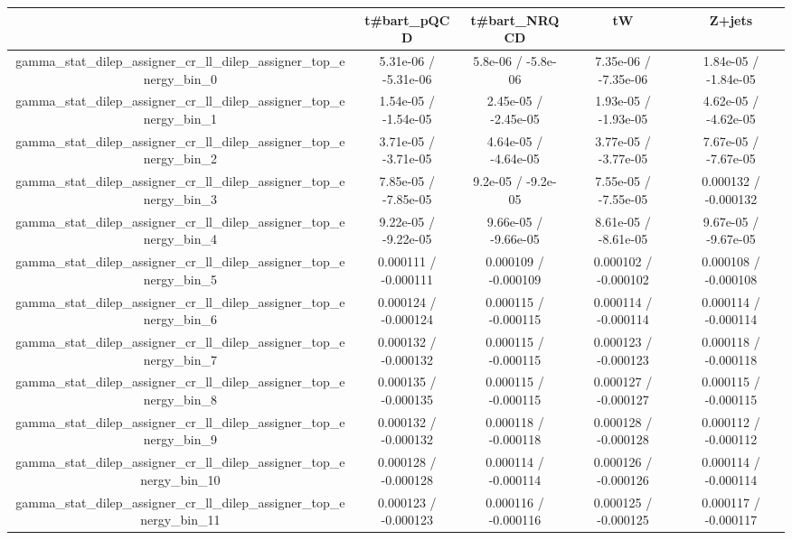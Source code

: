 \documentclass[10pt]{article}
\begin{document}
\begin{table}[htbp]
\begin{center}
\begin{tabular}{|c|c|c|c|c|}
\hline 
      & t#bar{t}_{pQCD}      & t#bar{t}_{NRQCD}      & tW      & Z+jets \\ 
\hline 
  gamma_stat_dilep_assigner_cr_ll_dilep_assigner_top_energy_bin_0 & 5.31e-06 / -5.31e-06 & 5.8e-06 / -5.8e-06 & 7.35e-06 / -7.35e-06 & 1.84e-05 / -1.84e-05 \\ 
  gamma_stat_dilep_assigner_cr_ll_dilep_assigner_top_energy_bin_1 & 1.54e-05 / -1.54e-05 & 2.45e-05 / -2.45e-05 & 1.93e-05 / -1.93e-05 & 4.62e-05 / -4.62e-05 \\ 
  gamma_stat_dilep_assigner_cr_ll_dilep_assigner_top_energy_bin_2 & 3.71e-05 / -3.71e-05 & 4.64e-05 / -4.64e-05 & 3.77e-05 / -3.77e-05 & 7.67e-05 / -7.67e-05 \\ 
  gamma_stat_dilep_assigner_cr_ll_dilep_assigner_top_energy_bin_3 & 7.85e-05 / -7.85e-05 & 9.2e-05 / -9.2e-05 & 7.55e-05 / -7.55e-05 & 0.000132 / -0.000132 \\ 
  gamma_stat_dilep_assigner_cr_ll_dilep_assigner_top_energy_bin_4 & 9.22e-05 / -9.22e-05 & 9.66e-05 / -9.66e-05 & 8.61e-05 / -8.61e-05 & 9.67e-05 / -9.67e-05 \\ 
  gamma_stat_dilep_assigner_cr_ll_dilep_assigner_top_energy_bin_5 & 0.000111 / -0.000111 & 0.000109 / -0.000109 & 0.000102 / -0.000102 & 0.000108 / -0.000108 \\ 
  gamma_stat_dilep_assigner_cr_ll_dilep_assigner_top_energy_bin_6 & 0.000124 / -0.000124 & 0.000115 / -0.000115 & 0.000114 / -0.000114 & 0.000114 / -0.000114 \\ 
  gamma_stat_dilep_assigner_cr_ll_dilep_assigner_top_energy_bin_7 & 0.000132 / -0.000132 & 0.000115 / -0.000115 & 0.000123 / -0.000123 & 0.000118 / -0.000118 \\ 
  gamma_stat_dilep_assigner_cr_ll_dilep_assigner_top_energy_bin_8 & 0.000135 / -0.000135 & 0.000115 / -0.000115 & 0.000127 / -0.000127 & 0.000115 / -0.000115 \\ 
  gamma_stat_dilep_assigner_cr_ll_dilep_assigner_top_energy_bin_9 & 0.000132 / -0.000132 & 0.000118 / -0.000118 & 0.000128 / -0.000128 & 0.000112 / -0.000112 \\ 
  gamma_stat_dilep_assigner_cr_ll_dilep_assigner_top_energy_bin_10 & 0.000128 / -0.000128 & 0.000114 / -0.000114 & 0.000126 / -0.000126 & 0.000114 / -0.000114 \\ 
  gamma_stat_dilep_assigner_cr_ll_dilep_assigner_top_energy_bin_11 & 0.000123 / -0.000123 & 0.000116 / -0.000116 & 0.000125 / -0.000125 & 0.000117 / -0.000117 \\ 

\end{tabular}
\end{center}
\end{table}
\end{document}
